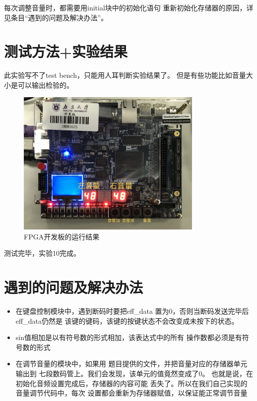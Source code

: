 \documentclass[12pt,a4paper,UTF8]{article}
\begin{document}
每次调整音量时，都需要用initial块中的初始化语句
重新初始化存储器的原因，详见条目``遇到的问题及解决办法''。


\section{测试方法+实验结果}
此实验写不了test bench，只能用人耳判断实验结果了。
但是有些功能比如音量大小是可以输出检验的。
\begin{figure}[H]
  \centering
  \includegraphics[width=0.8\textwidth]{volume.jpg}
  \caption{FPGA开发板的运行结果}
  \label{fpga}
\end{figure}

测试完毕，实验10完成。

\section{遇到的问题及解决办法}
\begin{itemize}
  \item 在键盘控制模块中，遇到断码时要把\mbox{eff\_data}
        置为0，否则当断码发送完毕后\mbox{eff\_data}仍然是
        该键的键码，该键的按键状态不会改变成未按下的状态。
  \item sin值相加是以有符号数的形式相加，该表达式中的所有
        操作数都必须是有符号数的形式
  \item {}在调节音量的模块中，如果用
        题目提供的文件，并把音量对应的存储器单元输出到
        七段数码管上。我们会发现，该单元的值竟然变成了0。
        也就是说，在初始化音频设置完成后，存储器的内容可能
        丢失了。所以在我们自己实现的音量调节代码中，每次
        设置都会重新为存储器赋值，以保证能正常调节音量
\end{itemize}
\end{document}
